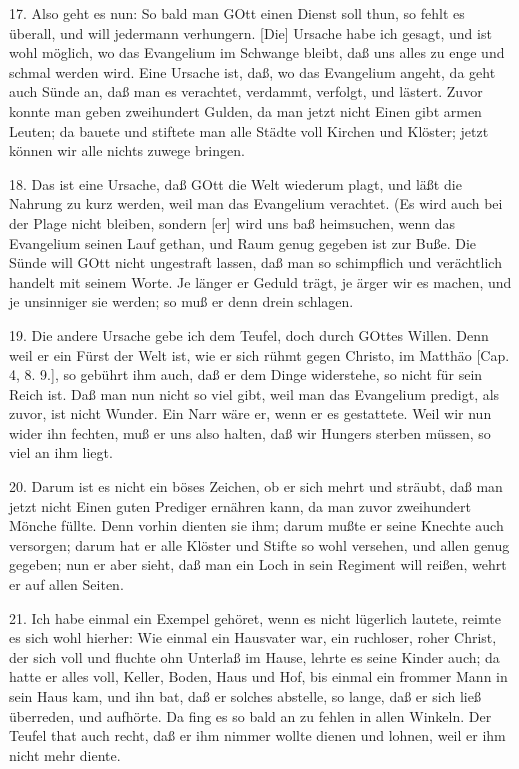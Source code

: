 17. Also geht es nun: So bald man GOtt einen Dienst soll thun, so fehlt es überall, und will jedermann verhungern. [Die] Ursache habe ich gesagt, und ist wohl möglich, wo das Evangelium im Schwange bleibt, daß uns alles zu enge und schmal werden wird. Eine Ursache ist, daß, wo das Evangelium angeht, da geht auch Sünde an, daß man es verachtet, verdammt, verfolgt, und lästert. Zuvor konnte man geben zweihundert Gulden, da man jetzt nicht Einen gibt armen Leuten; da bauete und stiftete man alle Städte voll Kirchen und Klöster; jetzt können wir alle nichts zuwege bringen.

18. Das ist eine Ursache, daß GOtt die Welt wiederum plagt, und läßt die Nahrung zu kurz werden, weil man das Evangelium verachtet. (Es wird auch bei der Plage nicht bleiben, sondern [er] wird uns baß heimsuchen, wenn das Evangelium seinen Lauf gethan, und Raum genug gegeben ist zur Buße. Die Sünde will GOtt nicht ungestraft lassen, daß man so schimpflich und verächtlich handelt mit seinem Worte. Je länger er Geduld trägt, je ärger wir es machen, und je unsinniger sie werden; so muß er denn drein schlagen.

19. Die andere Ursache gebe ich dem Teufel, doch durch GOttes Willen. Denn weil er ein Fürst der Welt ist, wie er sich rühmt gegen Christo, im Matthäo [Cap. 4, 8. 9.], so gebührt ihm auch, daß er dem Dinge widerstehe, so nicht für sein Reich ist. Daß man nun nicht so viel gibt, weil man das Evangelium predigt, als zuvor, ist nicht Wunder. Ein Narr wäre er, wenn er es gestattete. Weil wir nun wider ihn fechten, muß er uns also halten, daß wir Hungers sterben müssen, so viel an ihm liegt.

20. Darum ist es nicht ein böses Zeichen, ob er sich mehrt und sträubt, daß man jetzt nicht Einen guten Prediger ernähren kann, da man zuvor zweihundert Mönche füllte. Denn vorhin dienten sie ihm; darum mußte er seine Knechte auch versorgen; darum hat er alle Klöster und Stifte so wohl versehen, und allen genug gegeben; nun er aber sieht, daß man ein Loch in sein Regiment will reißen, wehrt er auf allen Seiten.

21. Ich habe einmal ein Exempel gehöret, wenn es nicht lügerlich lautete, reimte es sich wohl hierher: Wie einmal ein Hausvater war,
ein ruchloser, roher Christ, der sich voll und fluchte ohn Unterlaß im Hause, lehrte es seine Kinder auch; da hatte er alles voll, Keller, Boden, Haus und Hof, bis einmal ein frommer Mann in sein Haus kam, und ihn bat, daß er solches abstelle, so lange, daß er sich ließ überreden, und aufhörte. Da fing es so bald an zu fehlen in allen Winkeln. Der Teufel that auch recht, daß er ihm nimmer wollte dienen und lohnen, weil er ihm nicht mehr diente.

